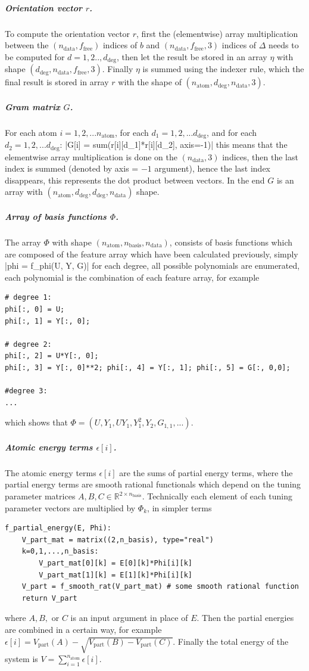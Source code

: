 \documentclass[12pt]{article}
\begin{document}
\subparagraph{Orientation vector $r$.}
To compute the orientation vector $r$, first  the (elementwise) array multiplication between the $(n_\text{data}, f_\text{free})$ indices of $b$ and $(n_\text{data}, f_\text{free}, 3)$ indices of $\Delta$ needs to be computed for $d=1,2..,d_\text{deg}$, then let the result be stored in an array $\eta$ with shape $(d_\text{deg}, n_\text{data}, f_\text{free}, 3)$. Finally $\eta$ is summed using the indexer rule, which the final result is stored in array $r$ with the shape of $(n_\text{atom}, d_\text{deg}, n_\text{data}, 3)$.

\subparagraph{Gram matrix $G$.}
For each atom $i=1,2, ... n_\text{atom}$, for each $d_1 = 1,2,... d_\text{deg}$, and for each $d_2 = 1,2,... d_\text{deg}$:
|G[i] = sum(r[i][d_1]*r[i][d_2], axis=-1)|
\noindent this means that the elementwise array multiplication is done on the $(n_\text{data}, 3)$ indices, then the last index is summed (denoted by axis = $-1$ argument), hence the last index disappears, this represents the dot product between vectors. In the end $G$ is an array with $(n_\text{atom}, d_\text{deg}, d_\text{deg}, n_\text{data})$ shape.

\subparagraph{Array of basis functions $\Phi$.}
The array $\Phi$ with shape $(n_\text{atom}, n_\text{basis}, n_\text{data})$, consists of basis functions which are composed of the feature array which have been calculated previously, simply
|phi = f_phi(U, Y, G)|
\noindent 
for each degree, all possible polynomials are enumerated, each polynomial is the combination of each feature array, for example
\begin{verbatim}
# degree 1:
phi[:, 0] = U;
phi[:, 1] = Y[:, 0];

# degree 2:
phi[:, 2] = U*Y[:, 0];
phi[:, 3] = Y[:, 0]**2; phi[:, 4] = Y[:, 1]; phi[:, 5] = G[:, 0,0];

#degree 3:
...

\end{verbatim}
which shows that $\Phi = (U, Y_1, UY_1, Y_1^2, Y_2, G_{1,1}, ...)$.

\subparagraph{Atomic energy terms $\epsilon[i]$.}
The atomic energy terms $\epsilon[i]$ are the sums of partial energy terms, where the partial energy terms are smooth rational functionals which depend on the tuning parameter matrices $A, B, C \in \mathbb{R}^{2 \times n_\text{basis}}$. Technically each element of each tuning parameter vectors are multiplied by $\Phi_k$, in simpler terms
\begin{verbatim}
f_partial_energy(E, Phi):
    V_part_mat = matrix((2,n_basis), type="real")
    k=0,1,...,n_basis:
        V_part_mat[0][k] = E[0][k]*Phi[i][k]
        V_part_mat[1][k] = E[1][k]*Phi[i][k]
    V_part = f_smooth_rat(V_part_mat) # some smooth rational function
    return V_part
\end{verbatim}
where $A, B,$ or $C$ is an input argument in place of $E$. Then the partial energies are combined in a certain way, for example $\epsilon[i] = V_\text{part}(A) - \sqrt{V_\text{part}(B) - V_\text{part}(C)}$. Finally the total energy of the system is $V = \sum^{n_\text{atom}}_{i=1} \epsilon[i]$.
\end{document}
